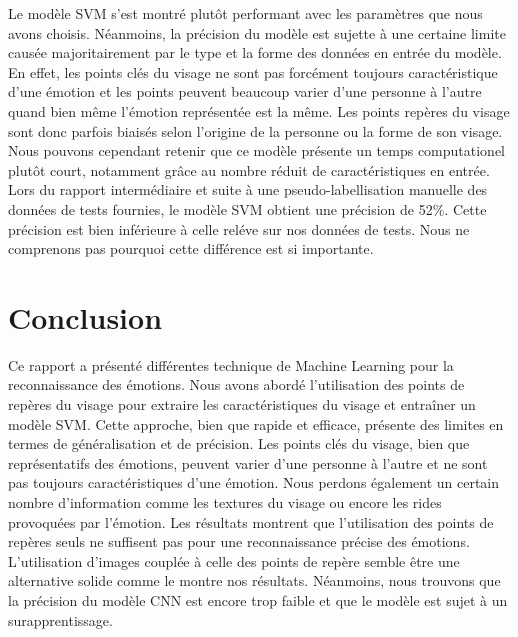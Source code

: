 \documentclass{rapport}
\begin{document}
Le modèle SVM s'est montré plutôt performant avec les paramètres que nous avons choisis. Néanmoins, la précision du modèle est sujette à une certaine limite causée
majoritairement par le type et la forme des données en entrée du modèle. En effet, les points clés du visage ne sont pas forcément toujours caractéristique d'une émotion
et les points peuvent beaucoup varier d'une personne à l'autre quand bien même l'émotion représentée est la même. Les points repères du visage sont donc parfois biaisés selon
l'origine de la personne ou la forme de son visage. Nous pouvons cependant retenir que ce modèle présente un temps computationel plutôt court, notamment grâce au nombre réduit
de caractéristiques en entrée.\\
Lors du rapport intermédiaire et suite à une pseudo-labellisation manuelle des données de tests fournies, le modèle SVM obtient une précision de 52\%.
Cette précision est bien inférieure à celle reléve sur nos données de tests. Nous ne comprenons pas pourquoi cette différence est si importante.

\section{Conclusion}
Ce rapport a présenté différentes technique de Machine Learning pour la reconnaissance des émotions.
Nous avons abordé l'utilisation des points de repères du visage pour extraire les caractéristiques du visage et entraîner un modèle SVM.
Cette approche, bien que rapide et efficace, présente des limites en termes de généralisation et de précision. Les points clés du visage,
bien que représentatifs des émotions, peuvent varier d'une personne à l'autre et ne sont pas toujours caractéristiques d'une émotion.
Nous perdons également un certain nombre d'information comme les textures du visage ou encore les rides provoquées par l'émotion.
Les résultats montrent que l'utilisation des points de repères seuls ne suffisent pas pour une reconnaissance précise des émotions.
L'utilisation d'images couplée à celle des points de repère semble être une alternative solide comme le montre nos résultats. Néanmoins, nous
trouvons que la précision du modèle CNN est encore trop faible et que le modèle est sujet à un surapprentissage.




\end{document}
